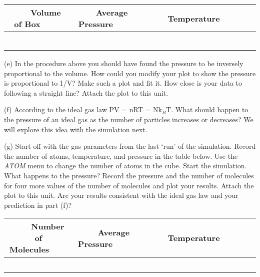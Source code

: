 \vspace{0.3cm}
{\centering \begin{tabular}{|c|c|c|}
\hline 
~~~~{}Volume of Box~~~~&
~~~~Average Pressure~~~&
~~~~~~Temperature~~~~~~~\\
\hline
\hline 
& &
\\
\hline 
& &
\\
\hline 
& &
\\
\hline 
& &
\\
\hline 
& &
\\
\hline 
& &
\\
\hline
\end{tabular}\par}
\vspace{0.3cm}

(e) In the procedure above you should have found the pressure to be inversely
proportional to the volume. How could you modify your plot to show
the pressure is proportional to 1/V? Make such a plot and fit it.
How close is your data to following a straight line? Attach the plot
to this unit.
\vspace{1.5in}

(f) According to the ideal gas law PV = nRT = Nk\( _{B} \)T. What
should happen to the pressure of an ideal gas as the number of particles
increases or decreases?
We will explore this idea with the simulation next.
\vspace{1.5in}

(g) Start off with the gas parameters from the last `run' of the 
simulation.
Record the number of atoms, temperature, and pressure in the table below.
Use the {\it ATOM} menu to change the number of atoms in the cube.
Start
the simulation. What happens to the pressure? Record the pressure
and the number of molecules for four more values of the number of
molecules and plot your results. Attach the plot to this unit. Are your results consistent with
the ideal gas law and your prediction in part (f)?
\vspace{1.5in}

\vspace{0.3cm}
{\centering \begin{tabular}{|c|c|c|}
\hline 
~~~~Number of Molecules~~~~&
~~~~Average Pressure~~~~&
~~~~~~Temperature~~~~~~~\\
\hline
\hline 
& &
\\
\hline 
& &
\\
\hline 
& &
\\
\hline 
& &
\\
\hline 
& &
\\
\hline
\end{tabular}\par}
\vspace{0.3cm}

